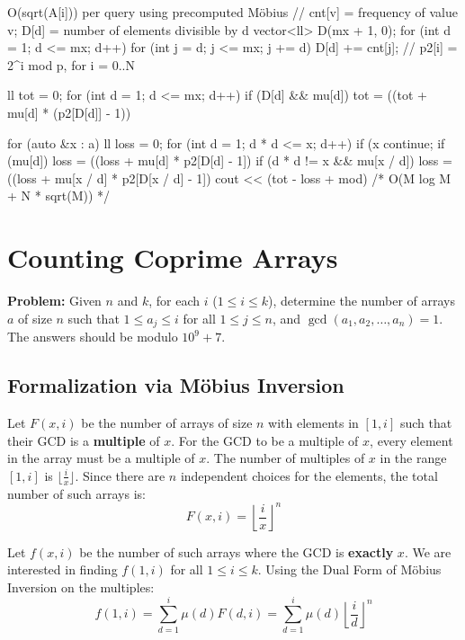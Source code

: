 \documentclass[11pt]{article}
\begin{document}
\begin{vscode}{O(sqrt(A[i])) per query using precomputed Möbius}
// cnt[v] = frequency of value v; D[d] = number of elements divisible by d
vector<ll> D(mx + 1, 0);
for (int d = 1; d <= mx; d++)
    for (int j = d; j <= mx; j += d)
        D[d] += cnt[j];
// p2[i] = 2^i mod p, for i = 0..N

ll tot = 0;
for (int d = 1; d <= mx; d++)
    if (D[d] && mu[d])
        tot = ((tot + mu[d] * (p2[D[d]] - 1)) %

for (auto &x : a)
{
    ll loss = 0;
    for (int d = 1; d * d <= x; d++)
    {
        if (x %
            continue;
        if (mu[d])
            loss = ((loss + mu[d] * p2[D[d] - 1]) %
        if (d * d != x && mu[x / d])
            loss = ((loss + mu[x / d] * p2[D[x / d] - 1]) %
    }
    cout << (tot - loss + mod) %
}
/* O(M log M + N * sqrt(M)) */
\end{vscode}

\pagebreak
\section{Counting Coprime Arrays}
\label{sec:coprime_arrays}

\textbf{Problem:} Given $n$ and $k$, for each $i$ ($1 \le i \le k$), determine the number of arrays $a$ of size $n$ such that $1 \le a_j \le i$ for all $1 \le j \le n$, and $\gcd(a_1, a_2, \dots, a_n) = 1$. The answers should be modulo $10^9 + 7$.

\subsection{Formalization via Möbius Inversion}

\begin{derivation}
    Let $F(x, i)$ be the number of arrays of size $n$ with elements in $[1, i]$ such that their GCD is a \textbf{multiple} of $x$.
    For the GCD to be a multiple of $x$, every element in the array must be a multiple of $x$. The number of multiples of $x$ in the range $[1, i]$ is $\lfloor \frac{i}{x} \rfloor$.
    Since there are $n$ independent choices for the elements, the total number of such arrays is:
    \[ F(x, i) = \left\lfloor \frac{i}{x} \right\rfloor^n \]

    Let $f(x, i)$ be the number of such arrays where the GCD is \textbf{exactly} $x$. We are interested in finding $f(1, i)$ for all $1 \le i \le k$.
    Using the Dual Form of Möbius Inversion on the multiples:
    \[ f(1, i) = \sum_{d=1}^i \mu(d) F(d, i) = \sum_{d=1}^i \mu(d) \left\lfloor \frac{i}{d} \right\rfloor^n \]
\end{derivation}
\end{document}
